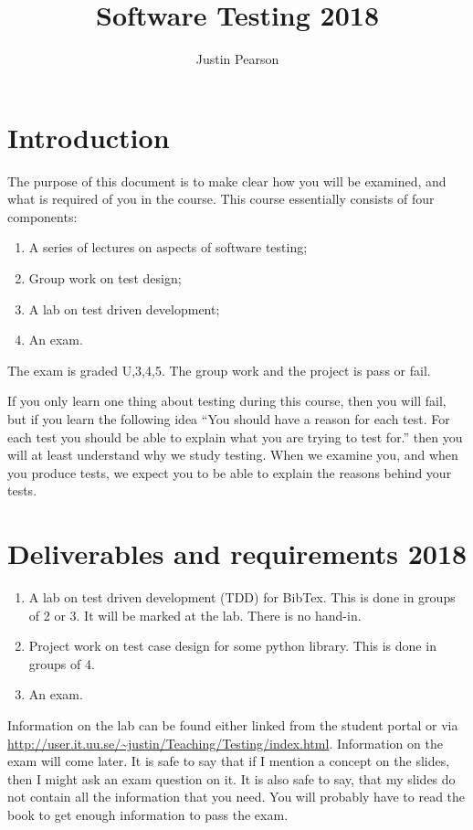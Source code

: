 \documentclass[a4page]{article}
\title{Software Testing 2018}
\author{Justin Pearson}
\begin{document}
\maketitle



\section{Introduction}
The purpose of this document is to make clear how you will be examined, and
what is required of you in the course.  This course essentially consists of
four components:
\begin{enumerate}
\item A series of lectures on aspects of software testing;
\item Group work on test design;
\item A lab on test driven development;
\item An exam.
\end{enumerate}
The exam is graded U,3,4,5. The group work and the project is pass or fail.

If you only learn one thing about testing during this course, then you will
fail, but if you learn the following idea ``You should have a reason for each
test. For each test you should be able to explain what you are trying to test
for.'' then you will at least understand why we study testing. When we examine
you, and when you produce tests, we expect you to be able to explain the
reasons behind your tests.


\section{Deliverables and requirements  2018}



\begin{enumerate}
\item A lab on  test driven development (TDD) for  BibTex.   This is
  done in groups of 2 or 3. It will be marked at the lab. There is no
  hand-in. 


\item Project work on test case design for some python library. This
  is done in groups of 4.
\item An exam.

  \end{enumerate}


  Information on the lab can be found either linked from the student portal or
  via
  \url{http://user.it.uu.se/~justin/Teaching/Testing/index.html}. Information
  on the exam will come later. It is safe to say that if I mention a concept
  on the slides, then I might ask an exam question on it. It is also safe to
  say, that my slides do not contain all the information that you need. You
  will probably have to read the book to get enough information to pass the
  exam.
\end{document}
